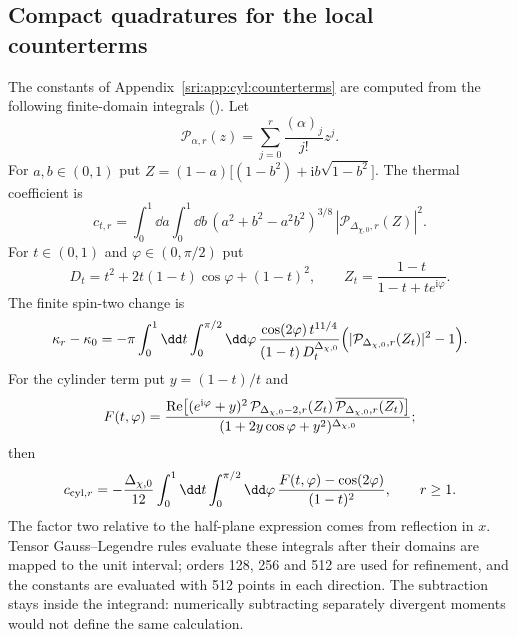 \subsection{Compact quadratures for the local counterterms}\label{sri:app:cyl:quadratures}
The constants of Appendix~\ref{sri:app:cyl:counterterms} are computed from the following finite-domain integrals
(). Let
\begin{equation}
 \mathcal P_{\alpha,r}(z)=\sum_{j=0}^r\frac{(\alpha)_j}{j!}z^j.
\end{equation}
For $a,b\in(0,1)$ put $Z=(1-a)\bigl[(1-b^2)+\mathrm ib\sqrt{1-b^2}\bigr]$. The thermal coefficient is
\begin{equation}
 c_{t,r}=\int_0^1\dd a\int_0^1\dd b\,(a^2+b^2-a^2b^2)^{3/8}\,|\mathcal P_{\Delta_{\chi,0},r}(Z)|^2.
 \label{sri:eq:cyl:ctcompact}
\end{equation}
For $t\in(0,1)$ and $\varphi\in(0,\pi/2)$ put
\begin{equation}
 D_t=t^2+2t(1-t)\cos\varphi+(1-t)^2,\qquad Z_t=\frac{1-t}{1-t+te^{\mathrm i\varphi}}.
\end{equation}
The finite spin-two change is
\begin{equation}
 \kappa_r-\kappa_0=-\pi\int_0^1\dd t\int_0^{\pi/2}\dd\varphi\,\frac{\cos(2\varphi)\,t^{11/4}}{(1-t)\,D_t^{\Delta_{\chi,0}}}
 \Bigl(|\mathcal P_{\Delta_{\chi,0},r}(Z_t)|^2-1\Bigr).
 \label{sri:eq:cyl:kcompact}
\end{equation}
For the cylinder term put $y=(1-t)/t$ and
\begin{equation}
 F(t,\varphi)=\frac{{\rm Re}\bigl[(e^{\mathrm i\varphi}+y)^2\,\mathcal P_{\Delta_{\chi,0}-2,r}(Z_t)\,
 \overline{\mathcal P_{\Delta_{\chi,0},r}(Z_t)}\bigr]}{(1+2y\cos\varphi+y^2)^{\Delta_{\chi,0}}};
\end{equation}
then
\begin{equation}
 c_{{\rm cyl},r}=-\frac{\Delta_{\chi,0}}{12}\int_0^1\dd t\int_0^{\pi/2}\dd\varphi\,\frac{F(t,\varphi)-\cos(2\varphi)}{(1-t)^2},
 \qquad r\ge1.
 \label{sri:eq:cyl:cylcompact}
\end{equation}
The factor two relative to the half-plane expression comes from reflection in $x$. Tensor Gauss--Legendre rules
evaluate these integrals after their domains are mapped to the unit interval; orders 128, 256 and 512 are used for
refinement, and the constants are evaluated with 512 points in each direction. The subtraction stays inside the
integrand: numerically subtracting separately divergent moments would not define the same calculation.

